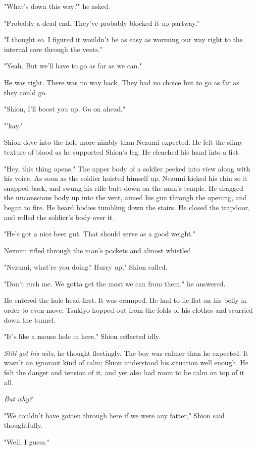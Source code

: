 "What's down this way?" he asked.

"Probably a dead end. They've probably blocked it up partway."

"I thought so. I figured it wouldn't be as easy as worming our way right
to the internal core through the vents."

"Yeah. But we'll have to go as far as we can."

He was right. There was no way back. They had no choice but to go as far
as they could go.

"Shion, I'll boost you up. Go on ahead."

"'kay."

Shion dove into the hole more nimbly than Nezumi expected. He felt the
slimy texture of blood as he supported Shion's leg. He clenched his hand
into a fist.

"Hey, this thing opens." The upper body of a soldier peeked into view
along with his voice. As soon as the soldier hoisted himself up, Nezumi
kicked his chin so it snapped back, and swung his rifle butt down on the
man's temple. He dragged the unconscious body up into the vent, aimed
his gun through the opening, and began to fire. He heard bodies tumbling
down the stairs. He closed the trapdoor, and rolled the soldier's body
over it.

"He's got a nice beer gut. That should serve as a good weight."~

Nezumi rifled through the man's pockets and almost whistled.

"Nezumi, what're you doing? Hurry up," Shion called.

"Don't rush me. We gotta get the most we can from them," he answered.

He entered the hole head-first. It was cramped. He had to lie flat on
his belly in order to even move. Tsukiyo hopped out from the folds of
his clothes and scurried down the tunnel.

"It's like a mouse hole in here," Shion reflected idly.

\emph{Still got his wits}, he thought fleetingly. The boy was calmer than he
expected. It wasn't an ignorant kind of calm; Shion understood his
situation well enough. He felt the danger and tension of it, and yet
also had room to be calm on top of it all.

\emph{But why?}

"We couldn't have gotten through here if we were any fatter," Shion said
thoughtfully.

"Well, I guess."

